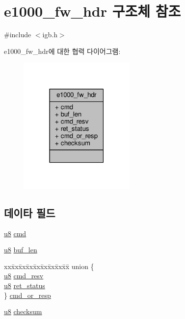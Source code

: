 \hypertarget{structe1000__fw__hdr}{}\section{e1000\+\_\+fw\+\_\+hdr 구조체 참조}
\label{structe1000__fw__hdr}


{\ttfamily \#include $<$igb.\+h$>$}



e1000\+\_\+fw\+\_\+hdr에 대한 협력 다이어그램\+:
\nopagebreak
\begin{figure}[H]
\begin{center}
\leavevmode
\includegraphics[width=162pt]{structe1000__fw__hdr__coll__graph}
\end{center}
\end{figure}
\subsection*{데이타 필드}
\begin{DoxyCompactItemize}
\item 
\hyperlink{lib_2igb_2e1000__osdep_8h_a8baca7e76da9e0e11ce3a275dd19130c}{u8} \hyperlink{structe1000__fw__hdr_a0c40b83f263927828422c91c3e9828be}{cmd}
\item 
\hyperlink{lib_2igb_2e1000__osdep_8h_a8baca7e76da9e0e11ce3a275dd19130c}{u8} \hyperlink{structe1000__fw__hdr_aa84cf7e5aebcb9675115b32997eb356d}{buf\+\_\+len}
\item 
\begin{tabbing}
xx\=xx\=xx\=xx\=xx\=xx\=xx\=xx\=xx\=\kill
union \{\\
\>\hyperlink{lib_2igb_2e1000__osdep_8h_a8baca7e76da9e0e11ce3a275dd19130c}{u8} \hyperlink{structe1000__fw__hdr_a42cdfda0c626a679500e9513e311da26}{cmd\_resv}\\
\>\hyperlink{lib_2igb_2e1000__osdep_8h_a8baca7e76da9e0e11ce3a275dd19130c}{u8} \hyperlink{structe1000__fw__hdr_a51c1ffde907ed7679f94d356a144da03}{ret\_status}\\
\} \hyperlink{structe1000__fw__hdr_a5577bc945674668f99476fb1fc958607}{cmd\_or\_resp}\\

\end{tabbing}\item 
\hyperlink{lib_2igb_2e1000__osdep_8h_a8baca7e76da9e0e11ce3a275dd19130c}{u8} \hyperlink{structe1000__fw__hdr_afd93107fee98407f162be1294fb053fd}{checksum}
\end{DoxyCompactItemize}


